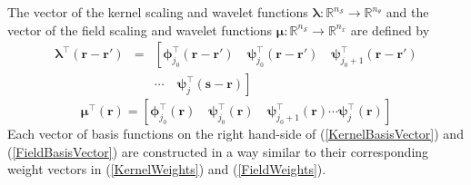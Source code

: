\documentclass[journal,a4paper]{IEEEtran}
\begin{document}
 The vector of the kernel scaling and wavelet functions $\boldsymbol\lambda: \mathbb{R}^{n_{\mathcal S}}\rightarrow \mathbb{R}^{n_{\theta}}$ and the vector of the field scaling and wavelet functions $\boldsymbol\mu: \mathbb{R}^{n_{\mathcal S}}\rightarrow \mathbb{R}^{n_x}$ are defined by
\begin{eqnarray}
 \boldsymbol\lambda^\top(\mathbf r-\mathbf r')&=&\left[ \boldsymbol\phi_{j_0}^\top(\mathbf r-\mathbf r') \quad \boldsymbol\psi_{j_0}^\top(\mathbf r-\mathbf r') \quad \boldsymbol\psi_{j_0+1}^\top(\mathbf r-\mathbf r') \right. \nonumber \\
&&\left. \cdots \quad \boldsymbol\psi_{j}^\top(\mathbf s-\mathbf r)\right]
\label{KernelBasisVector} 
\end{eqnarray}
\begin{equation}
 \boldsymbol\mu^\top(\mathbf r)=\left[ \boldsymbol\phi_{j_0}^\top(\mathbf r) \quad \boldsymbol\psi_{j_0}^\top(\mathbf r) \quad \boldsymbol\psi_{j_0+1}^\top(\mathbf r) \cdots \boldsymbol\psi_{j}^\top(\mathbf r) \right] 
\label{FieldBasisVector}
\end{equation}
Each vector of basis functions on the right hand-side of (\ref{KernelBasisVector}) and (\ref{FieldBasisVector}) are constructed in a way similar to their corresponding weight vectors in (\ref{KernelWeights}) and (\ref{FieldWeights}). 
\end{document}
